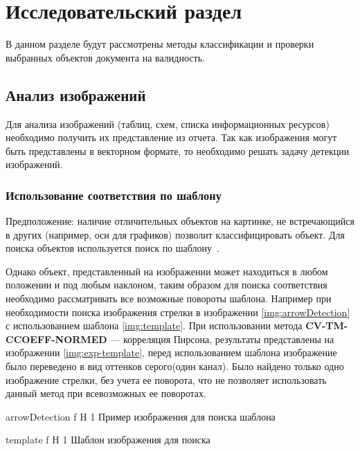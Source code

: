 \chapter{Исследовательский раздел}
В данном разделе будут рассмотрены методы классификации и проверки выбранных объектов документа на валидность.

\section{Анализ изображений}
Для анализа изображений (таблиц, схем, списка информационных ресурсов) необходимо получить их представление из отчета. Так как изображения могут быть представлены
в векторном формате, то необходимо решать задачу детекции изображений. 	



\subsection{Использование соответствия по шаблону}
Предположение: наличие отличительных объектов на картинке, не встречающийся в других (например, оси для графиков) позволит классифицировать объект.
Для поиска объектов используется поиск по шаблону~\cite{pattern_matching}.

Однако объект, представленный на изображении может находиться в любом положении и под любым наклоном, таким образом для поиска соответствия необходимо 
рассматривать все возможные повороты шаблона. Например при необходимости поиска изображения стрелки  в изображении \ref{img:arrowDetection} с использованием шаблона \ref{img:template}. При использовании метода \textbf{CV-TM-CCOEFF-NORMED} — корреляция Пирсона, результаты представлены на изображении \ref{img:exp-template}, перед использованием шаблона изображение было переведено в  вид оттенков серого(один канал).
Было найдено только одно изображение стрелки, без учета ее поворота, что не позволяет использовать данный метод при всевозможных ее поворотах.

{arrowDetection} %
{f} %
{H} %
{1\textwidth} %
{Пример изображения для поиска шаблона} %


{template} %
{f} %
{H} %
{1\textwidth} %
{Шаблон изображения для поиска} %



